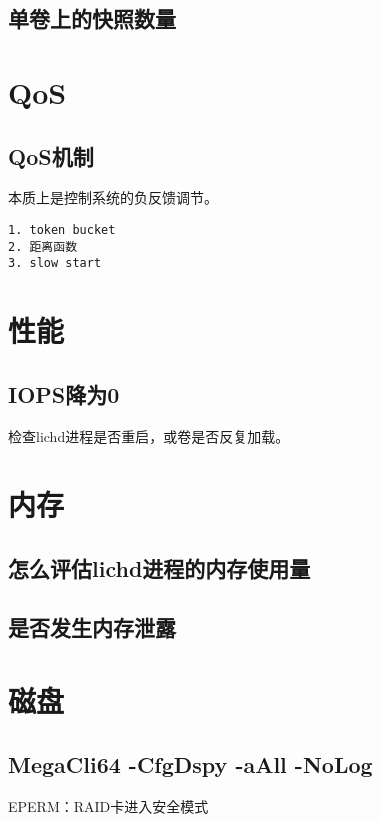 \subsection{单卷上的快照数量}

\section{QoS}

\subsection{QoS机制}

本质上是控制系统的负反馈调节。

\begin{lstlisting}
1. token bucket
2. 距离函数
3. slow start
\end{lstlisting}

\section{性能}

\subsection{IOPS降为0}

检查lichd进程是否重启，或卷是否反复加载。

\section{内存}

\subsection{怎么评估lichd进程的内存使用量}

\subsection{是否发生内存泄露}

\section{磁盘}

\subsection{MegaCli64 -CfgDspy -aAll -NoLog}

EPERM：RAID卡进入安全模式
